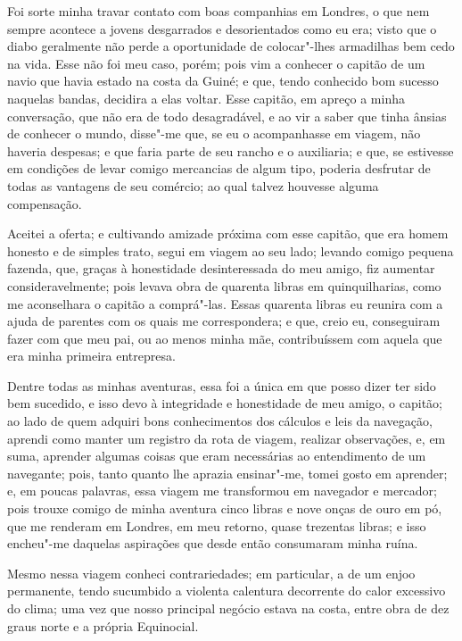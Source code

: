 Foi sorte minha travar contato com boas companhias em Londres, o que nem
sempre acontece a jovens desgarrados e desorientados como eu era; visto
que o diabo geralmente não perde a oportunidade de colocar"-lhes
armadilhas bem cedo na vida. Esse não foi meu caso, porém; pois vim a
conhecer o capitão de um navio que havia estado na costa da Guiné; e
que, tendo conhecido bom sucesso naquelas bandas, decidira a elas
voltar. Esse capitão, em apreço a minha conversação, que não era de todo
desagradável, e ao vir a saber que tinha ânsias de conhecer o mundo,
disse"-me que, se eu o acompanhasse em viagem, não haveria despesas; e
que faria parte de seu rancho e o auxiliaria; e que, se estivesse em
condições de levar comigo mercancias de algum tipo, poderia desfrutar de
todas as vantagens de seu comércio; ao qual talvez houvesse alguma
compensação.

Aceitei a oferta; e cultivando amizade próxima com esse capitão, que era
homem honesto e de simples trato, segui em viagem ao seu lado; levando
comigo pequena fazenda, que, graças à honestidade desinteressada do meu
amigo, fiz aumentar consideravelmente; pois levava obra de quarenta
libras em quinquilharias, como me aconselhara o capitão a comprá"-las.
Essas quarenta libras eu reunira com a ajuda de parentes com os quais me
correspondera; e que, creio eu, conseguiram fazer com que meu pai, ou ao
menos minha mãe, contribuíssem com aquela que era minha primeira
entrepresa.

Dentre todas as minhas aventuras, essa foi a única em que posso dizer
ter sido bem sucedido, e isso devo à integridade e honestidade de meu
amigo, o capitão; ao lado de quem adquiri bons conhecimentos dos
cálculos e leis da navegação, aprendi como manter um registro da rota de
viagem, realizar observações, e, em suma, aprender algumas coisas que
eram necessárias ao entendimento de um navegante; pois, tanto quanto lhe
aprazia ensinar"-me, tomei gosto em aprender; e, em poucas palavras, essa
viagem me transformou em navegador e mercador; pois trouxe comigo de
minha aventura cinco libras e nove onças de ouro em pó, que me renderam
em Londres, em meu retorno, quase trezentas libras; e isso encheu"-me
daquelas aspirações que desde então consumaram minha ruína.

Mesmo nessa viagem conheci contrariedades; em particular, a de um enjoo
permanente, tendo sucumbido a violenta calentura decorrente do calor
excessivo do clima; uma vez que nosso principal negócio estava na costa,
entre obra de dez graus norte e a própria Equinocial.

